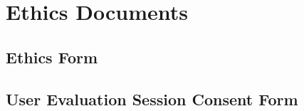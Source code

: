 \chapter{Ethics Documents}

\label{AppendixEthics}

\section{Ethics Form} \label{AppendixEthicsForm}


\section{User Evaluation Session Consent Form} \label{AppendixConsentForm}

